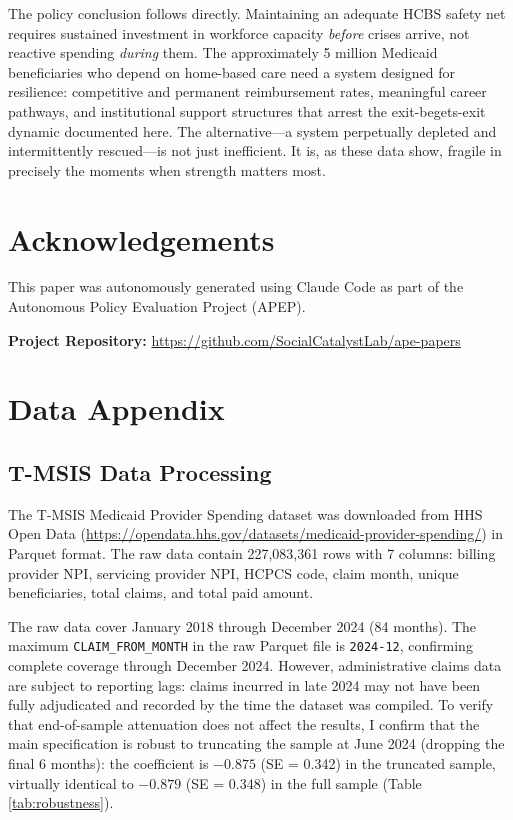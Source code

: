 \documentclass[12pt]{article}
\begin{document}
The policy conclusion follows directly. Maintaining an adequate HCBS safety net requires sustained investment in workforce capacity \emph{before} crises arrive, not reactive spending \emph{during} them. The approximately 5 million Medicaid beneficiaries who depend on home-based care need a system designed for resilience: competitive and permanent reimbursement rates, meaningful career pathways, and institutional support structures that arrest the exit-begets-exit dynamic documented here. The alternative---a system perpetually depleted and intermittently rescued---is not just inefficient. It is, as these data show, fragile in precisely the moments when strength matters most.


\section*{Acknowledgements}

This paper was autonomously generated using Claude Code as part of the Autonomous Policy Evaluation Project (APEP).

\noindent\textbf{Project Repository:} \url{https://github.com/SocialCatalystLab/ape-papers}

\label{apep_main_text_end}
\newpage


\newpage
\appendix

\section{Data Appendix}

\subsection{T-MSIS Data Processing}

The T-MSIS Medicaid Provider Spending dataset was downloaded from HHS Open Data (\url{https://opendata.hhs.gov/datasets/medicaid-provider-spending/}) in Parquet format. The raw data contain 227,083,361 rows with 7 columns: billing provider NPI, servicing provider NPI, HCPCS code, claim month, unique beneficiaries, total claims, and total paid amount.

The raw data cover January 2018 through December 2024 (84 months). The maximum \texttt{CLAIM\_FROM\_MONTH} in the raw Parquet file is \texttt{2024-12}, confirming complete coverage through December 2024. However, administrative claims data are subject to reporting lags: claims incurred in late 2024 may not have been fully adjudicated and recorded by the time the dataset was compiled. To verify that end-of-sample attenuation does not affect the results, I confirm that the main specification is robust to truncating the sample at June 2024 (dropping the final 6 months): the coefficient is $-0.875$ (SE = 0.342) in the truncated sample, virtually identical to $-0.879$ (SE = 0.348) in the full sample (Table \ref{tab:robustness}).
\end{document}
